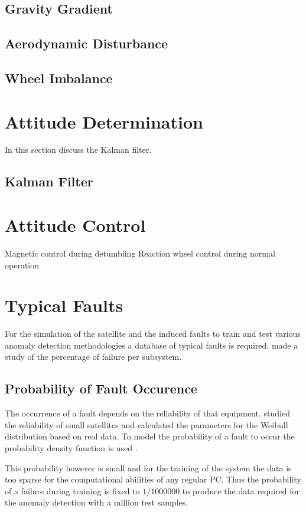 \subsection{Gravity Gradient}

\subsection{Aerodynamic Disturbance}
\cite{Steyn2014}

\subsection{Wheel Imbalance}

\section{Attitude Determination}
In this section discuss the Kalman filter.

\subsection{Kalman Filter}
\cite{Jones2017}

\section{Attitude Control}
Magnetic control during detumbling
Reaction wheel control during normal operation

\section{Typical Faults}
For the simulation of the satellite and the induced faults to train and test various anomaly detection methodologies a database of typical faults is required. \textcite{tafazoli2009study} made a study of the percentage of failure per subsystem. 

\subsection{Probability of Fault Occurence}
The occurrence of a fault depends on the reliability of that equipment. \textcite{Guo2014} studied the reliability of small satellites and calculated the parameters for the Weibull distribution based on real data. To model the probability of a fault to occur the probability density function is used \cite{Jones2017}.

This probability however is small and for the training of the system the data is too sparse for the computational abilities of any regular PC. Thus the probability of a failure during training is fixed to $1/1000000$ to produce the data required for the anomaly detection with a million test samples.


